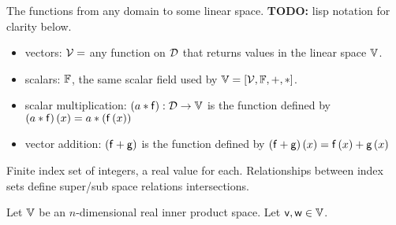 \begin{example}
The functions from any domain to some linear space.
\textbf{TODO:} lisp notation for clarity below.
\begin{itemize}
  \item vectors: ${\mathcal{V}} = $ any function on ${\mathcal{D}}$
  that returns values in the linear space ${\mathbb{V}}$.
  \item scalars: ${\mathbb{F}}$, the same scalar field used by
  ${\mathbb{V}}=\left[ {\mathcal{V}}, {\mathbb{F}}, +, * \right]$.
  \item scalar multiplication:
  $ \left(a*{\mathsf{f}}\right) : {\mathcal{D}} \rightarrow {\mathbb{V}}$
  is the function defined by
   $ \left(a*{\mathsf{f}}\right) (x)
   = a*\left({\mathsf{f}}\left( x \right) \right) $
  \item vector addition:
  $\left( {\mathsf{f}} + {\mathsf{g}} \right) $
  is the function defined by
  $\left( {\mathsf{f}} + {\mathsf{g}} \right) \left( x \right) =
  {\mathsf{f}} \left( x \right) + {\mathsf{g}} \left( x\right)$
\end{itemize}
\end{example}

\begin{example}
\bigskip
Finite index set of integers, a real value for each.
Relationships between index sets define super/sub space relations
intersections.
\end{example}

Let ${\mathbb{V}}$ be an $n$-dimensional real inner product space.
Let $\mathsf{v}, \mathsf{w} \in \mathbb{V}$.

